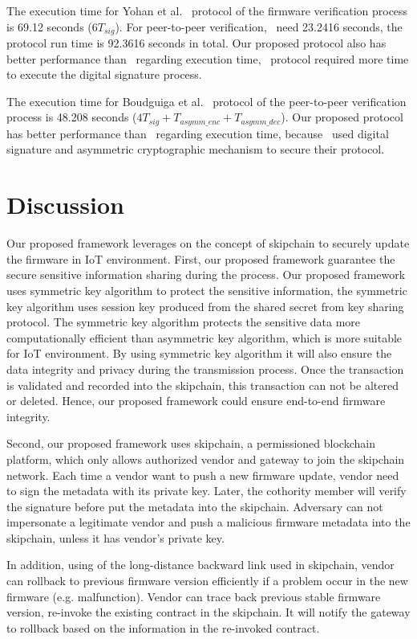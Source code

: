 The execution time for  Yohan et al.~\cite{yohan} protocol of the firmware verification process is 69.12 seconds ($6T_{sig}$). For peer-to-peer verification,~\cite{yohan} need 23.2416 seconds, the protocol run time is 92.3616 seconds in total. Our proposed protocol also has better performance than~\cite{yohan} regarding execution time,~\cite{yohan} protocol required more time to execute the digital signature process.

The execution time for Boudguiga et al.~\cite{boudguiga} protocol of the peer-to-peer verification process is 48.208 seconds ($4T_{sig}+T_{asymm\_enc}+T_{asymm\_dec}$). Our proposed protocol has better performance than~\cite{boudguiga} regarding execution time, because~\cite{boudguiga} used digital signature and asymmetric cryptographic mechanism to secure their protocol.

\section{Discussion} 
\label{sec:discussion}

Our proposed framework leverages on the concept of skipchain to securely update the firmware in IoT environment. First, our proposed framework guarantee the secure sensitive information sharing during the process. Our proposed framework uses symmetric key algorithm to protect the sensitive information, the symmetric key algorithm uses session key produced from the shared secret from key sharing protocol. The symmetric key algorithm protects the sensitive data more computationally efficient than asymmetric key algorithm, which is more suitable for IoT environment. By using symmetric key algorithm it will also ensure the data integrity and privacy during the transmission process. Once the transaction is validated and recorded into the skipchain, this transaction can not be altered or deleted. Hence, our proposed framework could ensure end-to-end firmware integrity.

Second, our proposed framework uses skipchain, a permissioned blockchain platform, which only allows authorized vendor and gateway to join the skipchain network. Each time a vendor want to push a new firmware update, vendor need to sign the metadata with its private key. Later, the cothority member will verify the signature before put the metadata into the skipchain. Adversary can not impersonate a legitimate vendor and push a malicious firmware metadata into the skipchain, unless it has vendor's private key.

In addition, using of the long-distance backward link used in skipchain, vendor can rollback to previous firmware version efficiently if a problem occur in the new firmware (e.g. malfunction). Vendor can trace back previous stable firmware version, re-invoke the existing contract in the skipchain. It will notify the gateway to rollback based on the information in the re-invoked contract.

